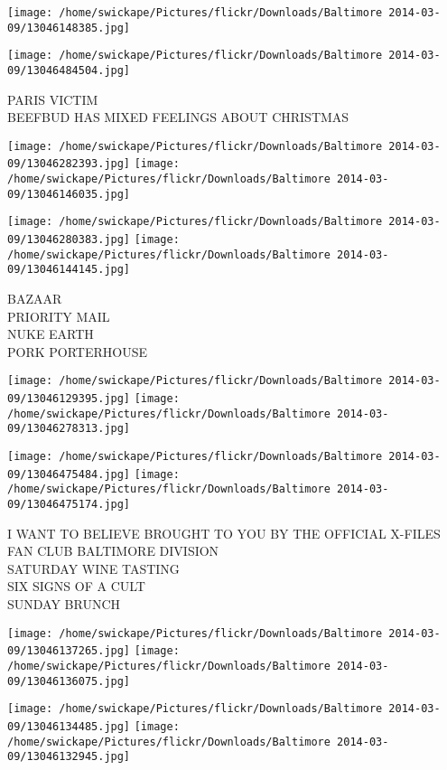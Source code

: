 \documentclass[10pt,letterpaper]{article}
\begin{document}
\texttt{[image: /home/swickape/Pictures/flickr/Downloads/Baltimore 2014-03-09/13046148385.jpg]}

\vspace{0.25in}
\texttt{[image: /home/swickape/Pictures/flickr/Downloads/Baltimore 2014-03-09/13046484504.jpg]}

PARIS VICTIM\\
BEEFBUD HAS MIXED FEELINGS ABOUT CHRISTMAS\\
\pagebreak

\texttt{[image: /home/swickape/Pictures/flickr/Downloads/Baltimore 2014-03-09/13046282393.jpg]}
\texttt{[image: /home/swickape/Pictures/flickr/Downloads/Baltimore 2014-03-09/13046146035.jpg]}

\texttt{[image: /home/swickape/Pictures/flickr/Downloads/Baltimore 2014-03-09/13046280383.jpg]}
\texttt{[image: /home/swickape/Pictures/flickr/Downloads/Baltimore 2014-03-09/13046144145.jpg]}

BAZAAR\\
PRIORITY MAIL\\
NUKE EARTH\\
PORK PORTERHOUSE\\
\pagebreak

\texttt{[image: /home/swickape/Pictures/flickr/Downloads/Baltimore 2014-03-09/13046129395.jpg]}
\texttt{[image: /home/swickape/Pictures/flickr/Downloads/Baltimore 2014-03-09/13046278313.jpg]}

\texttt{[image: /home/swickape/Pictures/flickr/Downloads/Baltimore 2014-03-09/13046475484.jpg]}
\texttt{[image: /home/swickape/Pictures/flickr/Downloads/Baltimore 2014-03-09/13046475174.jpg]}

I WANT TO BELIEVE BROUGHT TO YOU BY THE OFFICIAL X{-}FILES FAN CLUB BALTIMORE DIVISION\\
SATURDAY WINE TASTING\\
SIX SIGNS OF A CULT\\
SUNDAY BRUNCH\\
\pagebreak

\texttt{[image: /home/swickape/Pictures/flickr/Downloads/Baltimore 2014-03-09/13046137265.jpg]}
\texttt{[image: /home/swickape/Pictures/flickr/Downloads/Baltimore 2014-03-09/13046136075.jpg]}

\texttt{[image: /home/swickape/Pictures/flickr/Downloads/Baltimore 2014-03-09/13046134485.jpg]}
\texttt{[image: /home/swickape/Pictures/flickr/Downloads/Baltimore 2014-03-09/13046132945.jpg]}
\end{document}
